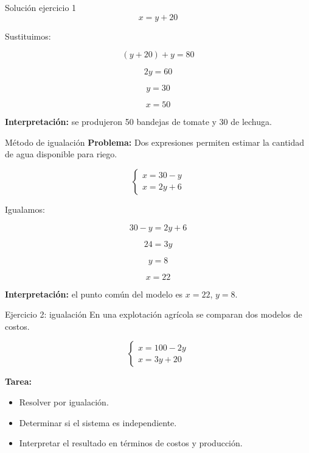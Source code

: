 \documentclass{beamer}
\begin{document}
	\begin{frame}{Solución ejercicio 1}
		\[
		x = y + 20
		\]
		
		Sustituimos:
		
		\[
		(y+20)+y=80
		\]
		
		\[
		2y=60
		\]
		
		\[
		y=30
		\]
		
		\[
		x=50
		\]
		
		\bigskip
		
		\textbf{Interpretación:} se produjeron 50 bandejas de tomate y 30 de lechuga.
	\end{frame}
	
	\begin{frame}{Método de igualación}
		\textbf{Problema:}  
		Dos expresiones permiten estimar la cantidad de agua disponible para riego.
		
		\[
		\begin{cases}
			x = 30 - y \\
			x = 2y + 6
		\end{cases}
		\]
		
		Igualamos:
		
		\[
		30-y=2y+6
		\]
		
		\[
		24=3y
		\]
		
		\[
		y=8
		\]
		
		\[
		x=22
		\]
		
		\bigskip
		
		\textbf{Interpretación:} el punto común del modelo es $x=22$, $y=8$.
	\end{frame}
	
	\begin{frame}{Ejercicio 2: igualación}
		En una explotación agrícola se comparan dos modelos de costos.
		
		\[
		\begin{cases}
			x = 100 - 2y \\
			x = 3y + 20
		\end{cases}
		\]
		
		\bigskip
		
		\textbf{Tarea:}
		
		\begin{itemize}
			\item Resolver por igualación.
			\item Determinar si el sistema es independiente.
			\item Interpretar el resultado en términos de costos y producción.
		\end{itemize}
	\end{frame}
	
\end{document}
